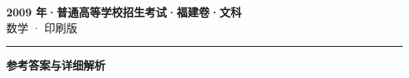 \documentclass[zihao=5, a4paper]{ctexart}
\begin{document}
\begin{center}
  {\Large\bfseries 2009 年·普通高等学校招生考试·福建卷·文科}\\[4pt]
  {\large 数学 · 印刷版}
\end{center}
\medskip
{}

\par\bigskip\hrule\bigskip
{}
\begin{center}{\large\bfseries 参考答案与详细解析}\end{center}
\smallskip

\end{document}
